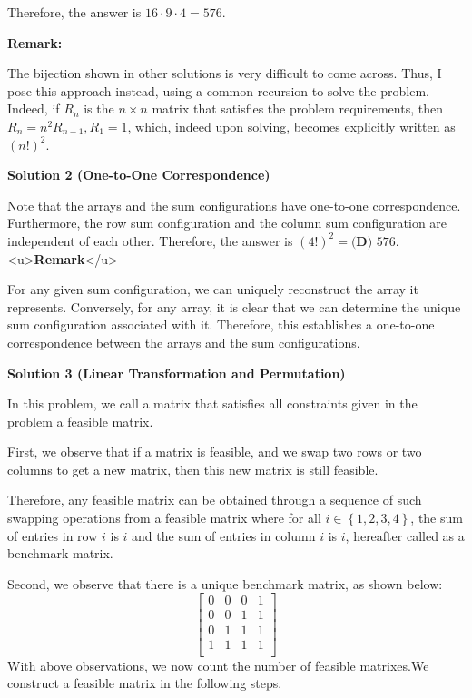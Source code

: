 \begin{enumerate}
 Therefore, the answer is $16 \cdot 9 \cdot 4 = \boxed{576}$.

 \textbf{Remark:}

 The bijection shown in other solutions is very difficult to come across. Thus, I pose this approach instead, using a common recursion to solve the problem. Indeed, if $R_n$ is the $n \times n$ matrix that satisfies the problem requirements, then $R_n = n^2 R_{n-1}, R_1 = 1$, which, indeed upon solving, becomes explicitly written as $(n!)^2$.

 



\textbf{Solution 2 (One-to-One Correspondence)}

Note that the arrays and the sum configurations have one-to-one correspondence. Furthermore, the row sum configuration and the column sum configuration are independent of each other. Therefore, the answer is $(4!)^2=\boxed{\textbf{(D) }576}.$
<u>\textbf{Remark}</u>

 For any given sum configuration, we can uniquely reconstruct the array it represents. Conversely, for any array, it is clear that we can determine the unique sum configuration associated with it. Therefore, this establishes a one-to-one correspondence between the arrays and the sum configurations.

 



\textbf{Solution 3 (Linear Transformation and Permutation)}

In this problem, we call a matrix that satisfies all constraints given in the problem a feasible matrix.

 First, we observe that if a matrix is feasible, and we swap two rows or two columns to get a new matrix, then this new matrix is still feasible.

 Therefore, any feasible matrix can be obtained through a sequence of such swapping operations from a feasible matrix where for all $i \in \left\{ 1, 2, 3 ,4 \right\}$, the sum of entries in row $i$ is $i$ and the sum of entries in column $i$ is $i$, hereafter called as a benchmark matrix.

 Second, we observe that there is a unique benchmark matrix, as shown below:
 \[\left[   \begin{array}{cccc}     0 & 0 & 0 & 1 \\     0 & 0 & 1 & 1 \\     0 & 1 & 1 & 1 \\     1 & 1 & 1 & 1 \\   \end{array} \right]\]With above observations, we now count the number of feasible matrixes.We construct a feasible matrix in the following steps.


\end{enumerate}
